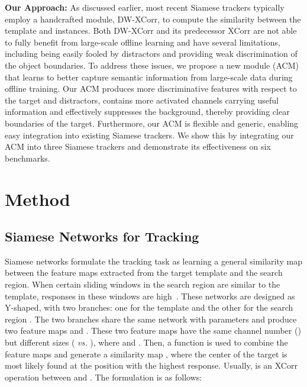 \documentclass[10pt,twocolumn,letterpaper,final]{cvpr}
\begin{document}
\noindent \textbf{Our Approach:} As discussed earlier, most recent Siamese trackers typically employ a handcrafted module, DW-XCorr, to compute the similarity between the template and instances. Both DW-XCorr and its predecessor XCorr are not able to fully benefit from large-scale offline learning and have several limitations, including being easily fooled by distractors and providing weak discrimination of the object boundaries. To address these issues, we propose a new module (ACM) that learns to better capture semantic information from large-scale data during offline training. Our ACM produces more discriminative features with respect to the target and distractors, contains more activated channels carrying useful information and effectively suppresses the background, thereby providing clear boundaries of the target. Furthermore, our ACM is flexible and generic, enabling easy integration into existing Siamese trackers. We show this by integrating our ACM into three Siamese trackers and demonstrate its effectiveness on six benchmarks.










\section{Method}





\subsection{Siamese Networks for Tracking}
Siamese networks formulate the tracking task as learning a general similarity map between the feature maps extracted from the target template and the search region. When certain sliding windows in the search region are similar to the template, responses in these windows are high~\cite{bertinetto2016fully}.
These networks are designed as Y-shaped, with two branches: one for the template  and the other for the search region .
The two branches share the same network  with parameters  and produce two feature maps  and . These two feature maps have the same channel number () but different sizes ( {\it vs.} ), where  and . Then, a function  is used to combine the feature maps and generate a similarity map , where the center of the target is most likely found at the position with the highest response. Usually,  is an XCorr operation  between  and . The formulation is as follows:
\end{document}
